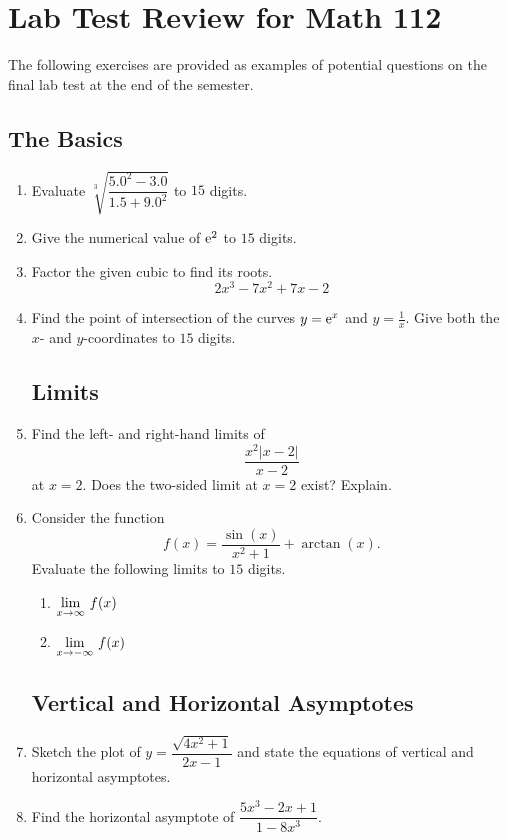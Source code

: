 \chapter{Lab Test Review for Math 112}

The following exercises are provided as examples of potential questions on the final lab test at the end of the semester.

\section*{The Basics}

\begin{enumerate}
\item Evaluate $\sqrt[3]{\dfrac{5.0^2 - 3.0}{1.5 + 9.0^2}}$ to $15$ digits.
\item Give the numerical value of ${\rm e}^2$ to $15$ digits.
\item Factor the given cubic to find its roots.\[ 2x^3 - 7x^2 + 7x -2 \]
\item Find the point of intersection of the curves $y = {\rm e}^x$ and $y = \frac{1}{x}$. Give both the $x$- and $y$-coordinates to $15$ digits.

\section*{Limits}

\item Find the left- and right-hand limits of  \[ \dfrac{x^2 |x-2|}{x-2} \] at $x=2$. Does the two-sided limit at $x=2$ exist? Explain.
\item Consider the function \[ f(x)=\frac{\sin(x)}{x^2+1}+\arctan(x). \] Evaluate the following limits to $15$ digits.
	\begin{enumerate}
	\item $\displaystyle\lim_{x\rightarrow \infty}\, f(x)$
	\item $\displaystyle\lim_{x\rightarrow -\infty}\, f(x)$
	\end{enumerate}

\section*{Vertical and Horizontal Asymptotes}

\item Sketch the plot of $y=\dfrac{ \sqrt{4x^2 + 1} }{2x - 1}$ and state the equations of vertical and horizontal asymptotes.
\item Find the horizontal asymptote of $\dfrac{5x^3 - 2x + 1}{1 - 8x^3}$.


\end{enumerate}
